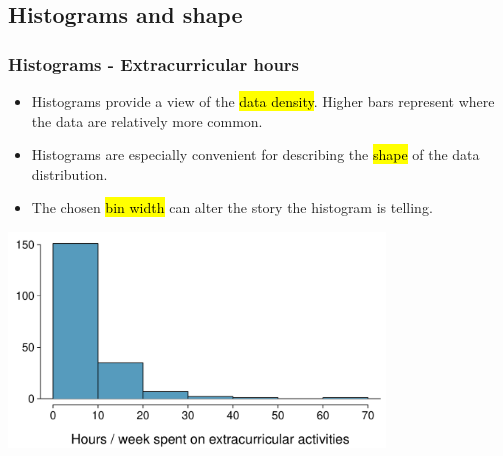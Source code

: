 
\subsection{Histograms and shape}


\begin{frame}[fragile]
\frametitle{Histograms - Extracurricular hours}

\begin{itemize}

\item Histograms provide a view of the \hl{data density}. Higher bars represent where the data are relatively more common.

\item Histograms are especially convenient for describing the \hl{shape} of the data distribution.

\item The chosen \hl{bin width} can alter the story the histogram is telling.

\end{itemize}

\begin{center}
\includegraphics[width=0.75\textwidth]{1-6_numerical_data/figures/extracurr_hrs_hist/extracurr_hrs_hist}
\end{center}

\end{frame}


